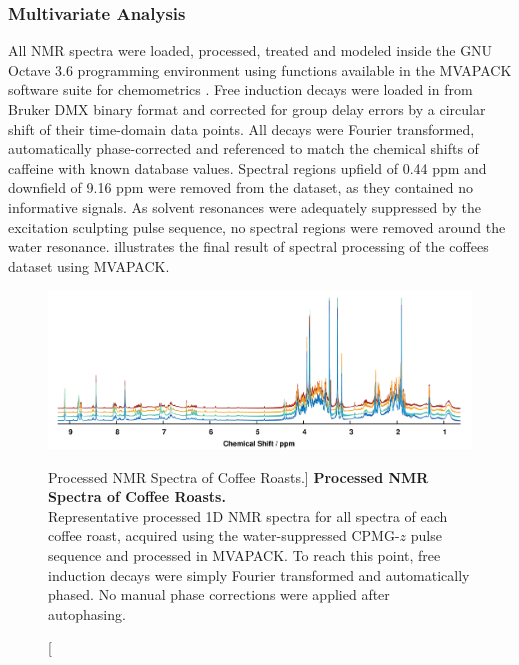 \subsubsection{Multivariate Analysis}

\begin{doublespace}
All NMR spectra were loaded, processed, treated and modeled inside the GNU
Octave 3.6 programming environment \cite{eaton2008} using functions available
in the MVAPACK software suite for chemometrics \cite{worley:acscb2014}.
Free induction decays were loaded in from Bruker DMX binary format and
corrected for group delay errors by a circular shift of their time-domain
data points. All decays were Fourier transformed, automatically phase-corrected
and referenced to match the chemical shifts of caffeine with known database
values. Spectral regions upfield of 0.44 ppm and downfield of 9.16 ppm were
removed from the dataset, as they contained no informative signals. As solvent
resonances were adequately suppressed by the excitation sculpting pulse
sequence, no spectral regions were removed around the water resonance.
 illustrates the final result of spectral processing
of the coffees dataset using MVAPACK.
\end{doublespace}

\begin{figure}[ht!]
\includegraphics[width=6in]{figs/apps/02-spectra.png}
\caption
      [Processed \hnmr{} NMR Spectra of Coffee Roasts.]{
  {\bf Processed \hnmr{} NMR Spectra of Coffee Roasts.}
  \\
  Representative processed 1D \hnmr{} NMR spectra for all spectra of each
  coffee roast, acquired using the water-suppressed CPMG-$z$ pulse sequence
  and processed in MVAPACK. To reach this point, free induction decays were
  simply Fourier transformed and automatically phased. No manual phase
  corrections were applied after autophasing.
}
\label{figure.4.2}
\end{figure}

